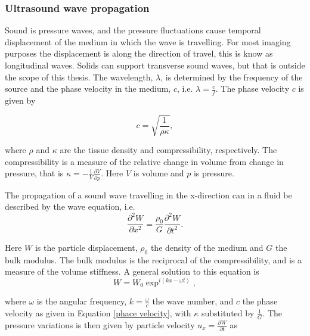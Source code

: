 \subsubsection{Ultrasound wave propagation}
Sound is pressure waves, and the pressure fluctuations cause temporal displacement of the medium in which the wave is travelling. For most imaging purposes the displacement is along the direction of travel, this is know as longitudinal waves. Solids can support transverse sound waves, but that is outside the scope of this thesis.  The wavelength, $\lambda$, is determined by the frequency of the source and the phase velocity in the medium, $c$, i.e. $\lambda= \frac{c}{f}$. The phase velocity $c$ is given by

\begin{equation}
\label{phace velocity}
c = \sqrt{\frac{1}{\rho \kappa}},
\end{equation}

where $\rho$ and $\kappa$ are the tissue density and compressibility, respectively.%
The compressibility is a measure of the relative change in volume from change in pressure, that is $\kappa = -\frac{1}{V}\frac{\partial V}{\partial p}$. Here $V$ is volume and $p$ is pressure. 

The propagation of a sound wave travelling in the x-direction can in a fluid be described by the wave equation, i.e.
\begin{equation}
\label{wave equation}
\frac{\partial^2W}{\partial x^2} = \frac{\rho_0}{G}\frac{\partial^2W}{\partial t^2}.
\end{equation}

Here $W$ is the particle displacement, $\rho_0$ the density of the medium and $G$ the bulk modulus\cite{Flower2012}. The bulk modulus is the reciprocal of the compressibility, and is a measure of the volume stiffness. A general solution to this equation is 
\begin{equation}
\label{particle displacement}
W = W_0 \exp^{i(kx - \omega t)},
\end{equation}

where $\omega$ is the angular frequency, $k = \frac{\omega}{c}$ the wave number, and $c$ the phase velocity as given in Equation \eqref{phace velocity}, with $\kappa$ substituted by $\frac{1}{G}$. The pressure variations is then given by particle velocity $u_x = \frac{\partial W}{\partial t}$ as 

